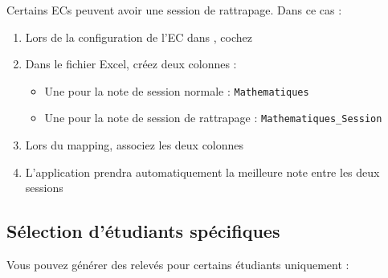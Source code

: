 Certains ECs peuvent avoir une session de rattrapage. Dans ce cas :

\begin{enumerate}[leftmargin=*]
    \item Lors de la configuration de l'EC dans , cochez 
    \item Dans le fichier Excel, créez deux colonnes :
    \begin{itemize}
        \item Une pour la note de session normale : \texttt{Mathematiques}
        \item Une pour la note de session de rattrapage : \texttt{Mathematiques\_Session}
    \end{itemize}
    \item Lors du mapping, associez les deux colonnes
    \item L'application prendra automatiquement la meilleure note entre les deux sessions
\end{enumerate}


\subsection{Sélection d'étudiants spécifiques}

Vous pouvez générer des relevés pour certains étudiants uniquement :

